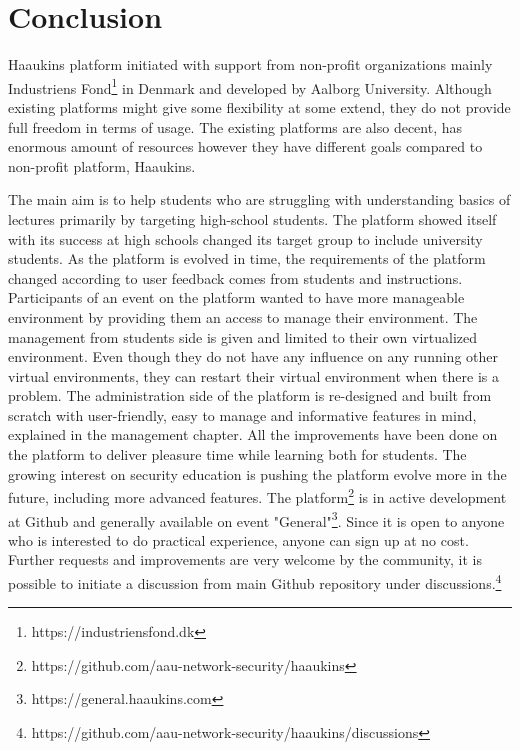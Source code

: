 \chapter{Conclusion}

Haaukins platform initiated with support from non-profit organizations mainly Industriens Fond\footnote{https://industriensfond.dk} in Denmark and developed by Aalborg University. Although existing platforms might give some flexibility at some extend, they do not provide full freedom in terms of usage. The existing platforms are also decent, has enormous amount of resources however they have different goals compared to non-profit platform, Haaukins. 


The main aim is to help students who are struggling with understanding basics of lectures primarily by targeting high-school students. The platform showed itself with its success at high schools changed its target group to include university students. As the platform is evolved in time, the requirements of the platform changed according to user feedback comes from students and instructions. Participants of an event on the platform wanted to have more manageable environment by providing them an access to manage their environment. The management from students side is given and limited to their own virtualized environment. Even though they do not have any influence on any running other virtual environments, they can restart their virtual environment when there is a problem. The administration side of the platform is re-designed and built from scratch with user-friendly, easy to manage and informative features in mind, explained in the management chapter.  All the improvements have been done on the platform to deliver pleasure time while learning both for students.
The growing interest on security education is pushing the platform evolve more in the future, including more advanced features. The platform\footnote{https://github.com/aau-network-security/haaukins} is in active development at Github and generally available on event "General"\footnote{https://general.haaukins.com}. Since it is open to anyone who is interested to do practical experience, anyone can sign up at no cost. 
Further requests and improvements are very welcome by the community, it is possible to initiate a discussion from main Github repository under discussions.\footnote{https://github.com/aau-network-security/haaukins/discussions}
    
